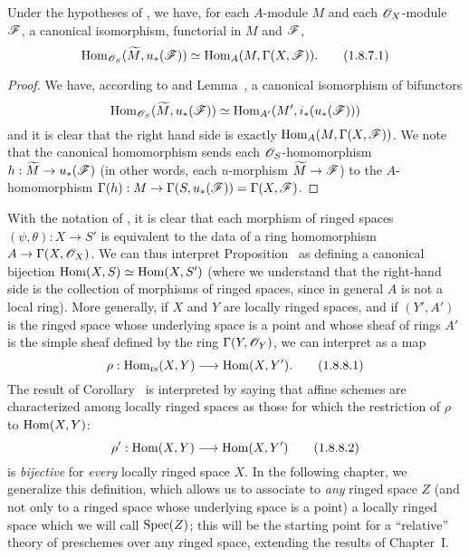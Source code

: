 \begin{corollary}[1.8.7]
\label{1.1.8.7}
Under the hypotheses of , we have, for each $A$-module $M$ and each $\mathscr{O}_X$-module $\mathscr{F}$, a canonical isomorphism, functorial in $M$ and $\mathscr{F}$,
\[
\label{1.1.8.7.1}
  \operatorname{Hom}_{\mathscr{O}_S}(\widetilde{M},u_*(\mathscr{F}))\simeq\operatorname{Hom}_A(M,\Gamma(X,\mathscr{F})).
  \tag{1.8.7.1}
\]
\end{corollary}

\begin{proof}
\label{proof-1.1.8.7}
We have, according to  and Lemma~, a canonical
isomorphism of bifunctors
\[
  \operatorname{Hom}_{\mathscr{O}_S}(\widetilde{M},u_*(\mathscr{F}))\simeq\operatorname{Hom}_{A'}(M',i_*(u_*(\mathscr{F})))
\]
and it is clear that the right hand side is exactly $\operatorname{Hom}_A(M,\Gamma(X,\mathscr{F}))$.
We note that the canonical homomorphism  sends each $\mathscr{O}_S$-homomorphism $h:\widetilde{M}\to u_*(\sh{F})$ (in other words, each $u$-morphism $\widetilde{M}\to\sh{F}$) to the $A$-homomorphism $\Gamma(h):M\to\Gamma(S,u_*(\sh{F}))=\Gamma(X,\sh{F})$.
\end{proof}

\begin{env}[1.8.8]
\label{1.1.8.8}
With the notation of , it is clear  that each morphism of ringed spaces $(\psi,\theta):X\to S'$ is equivalent to the data of a ring homomorphism $A\to\Gamma(X,\sh{O}_X)$.
We can thus interpret Proposition~ as defining a canonical bijection $\operatorname{Hom}(X,S)\simeq\operatorname{Hom}(X,S')$ (where we understand that the right-hand side is the collection of morphisms of ringed spaces, since in general $A$ is not a local ring).
More generally, if $X$ and $Y$ are locally ringed spaces, and if $(Y',A')$ is the ringed space whose underlying space is a point and whose sheaf of rings $A'$ is the simple sheaf defined by the ring $\Gamma(Y,\mathscr{O}_Y)$, we can interpret  as a map
\[
  \label{1.1.8.8.1}
  \rho:\Hom_\text{rs}(X,Y)\to\Hom(X,Y').
  \tag{1.8.8.1}
\]
The result of Corollary~ is interpreted by saying that affine schemes are characterized among locally ringed spaces as those for which the restriction of $\rho$ to
$\operatorname{Hom}(X,Y)$:
\[
  \label{1.1.8.8.2}
  \rho':\Hom(X,Y)\to\Hom(X,Y')
  \tag{1.8.8.2}
\]
is \emph{bijective} for \emph{every} locally ringed space $X$.
In the following chapter, we generalize this definition, which allows us to associate to \emph{any} ringed space $Z$ (and not only to a ringed space whose underlying space is a point) a locally ringed space which we will call $\operatorname{Spec}(Z)$;
this will be the starting point for a ``relative'' theory of preschemes over any ringed space, extending the results of Chapter~I.
\end{env}

